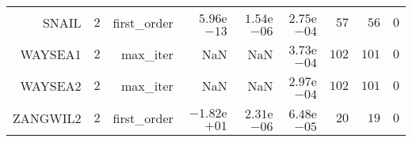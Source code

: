 \begin{longtable}{rrrrrrrrr}
SNAIL & \(     2\) & first\_order & \( 5.96\)e\(-13\) & \( 1.54\)e\(-06\) & \( 2.75\)e\(-04\) & \(    57\) & \(    56\) & \(     0\) \\
WAYSEA1 & \(     2\) & max\_iter &       NaN &       NaN & \( 3.73\)e\(-04\) & \(   102\) & \(   101\) & \(     0\) \\
WAYSEA2 & \(     2\) & max\_iter &       NaN &       NaN & \( 2.97\)e\(-04\) & \(   102\) & \(   101\) & \(     0\) \\
ZANGWIL2 & \(     2\) & first\_order & \(-1.82\)e\(+01\) & \( 2.31\)e\(-06\) & \( 6.48\)e\(-05\) & \(    20\) & \(    19\) & \(     0\) \\\hline
\end{longtable}

